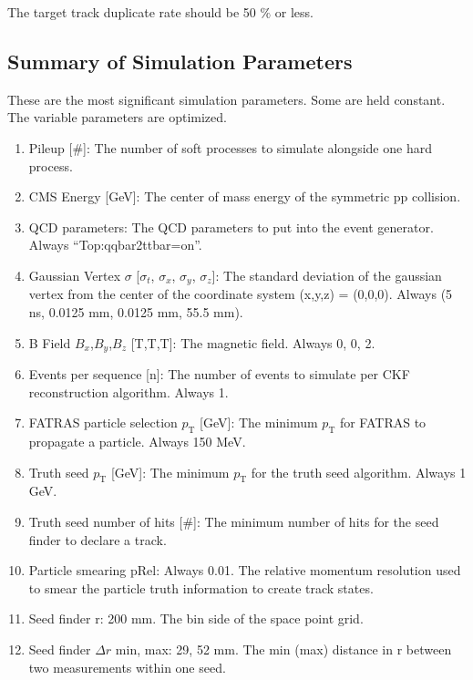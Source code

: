 \documentclass{article}
\newcommand{\pt}[0]{p_\textrm{T}}
\begin{document}

The target track duplicate rate should be 50 $\%$ or less.


\subsection{\label{spnfuad}Summary of Simulation Parameters}

These are the most significant simulation parameters. Some are held constant. The variable parameters are optimized.

\begin{enumerate}
\item Pileup [\#]: The number of soft processes to simulate alongside one hard process.
\item CMS Energy [GeV]: The center of mass energy of the symmetric pp collision.
\item QCD parameters: The QCD parameters to put into the event generator. Always ``Top:qqbar2ttbar=on''.
\item Gaussian Vertex $\sigma$ [$\sigma_t$, $\sigma_x$, $\sigma_y$, $\sigma_z$]: The standard deviation of the gaussian vertex from the center of the coordinate system (x,y,z) = (0,0,0). Always (5 ns, 0.0125 mm, 0.0125 mm, 55.5 mm).
\item B Field $B_x$,$B_y$,$B_z$ [T,T,T]: The magnetic field. Always 0, 0, 2.
\item Events per sequence [n]: The number of events to simulate per CKF reconstruction algorithm. Always 1.
\item FATRAS particle selection $\pt$ [GeV]: The minimum $\pt$ for FATRAS to propagate a particle. Always 150 MeV.
\item Truth seed $\pt$ [GeV]: The minimum $\pt$ for the truth seed algorithm. Always 1 GeV.
\item Truth seed number of hits [\#]: The minimum number of hits for the seed finder to declare a track.
\item Particle smearing pRel: Always 0.01. The relative momentum resolution used to smear the particle truth information to create track states.
\item Seed finder r: 200 mm. The bin side of the space point grid.
\item Seed finder $\Delta r$ min, max: 29, 52 mm. The min (max) distance in r between two measurements within one seed.

\end{enumerate}
\end{document}
